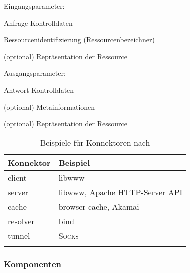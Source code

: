 Eingangsparameter:
\begin{compactitem}
    \item Anfrage-Kontrolldaten
    \item Ressourcenidentifizierung (Ressourcenbezeichner)
    \item[{\footnotesize (optional)}] Repräsentation der Ressource
\end{compactitem}
Ausgangsparameter:
\begin{compactitem}
    \item Antwort-Kontrolldaten
    \item[{\footnotesize (optional)}] Metainformationen
    \item[{\footnotesize (optional)}] Repräsentation der Ressource
\end{compactitem}


\begin{table}
    \begin{longtable}[c]{l l}
        \toprule
        \rowcolor{lightgray}
        \textbf{Konnektor}   & \textbf{Beispiel}\\
        \midrule
        client      & libwww\\
        server      & libwww, Apache \gls{HTTP}-Server \gls{API}\\
        cache       & browser cache, Akamai\\
        resolver    & bind\\
        tunnel      & \textsc{Socks}\\
        \bottomrule
        \caption{Beispiele für Konnektoren nach \cite{fieldingDissertation}}
        \label{tab:RESTconnectors}
    \end{longtable}
\end{table}       

\subsubsection{Komponenten}
\label{sec:RESTcomponents}


